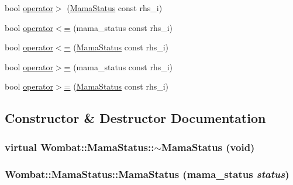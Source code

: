 \begin{DoxyCompactItemize}
bool \hyperlink{classWombat_1_1MamaStatus_a6e7e43173070445fd00008e30ebe528c}{operator$>$} (\hyperlink{classWombat_1_1MamaStatus}{MamaStatus} const rhs\_\-i)
\item 
bool \hyperlink{classWombat_1_1MamaStatus_a63e384ea83f45eabd80fee0d23bd9d45}{operator$<$=} (mama\_\-status const rhs\_\-i)
\item 
bool \hyperlink{classWombat_1_1MamaStatus_ab4c58d61bee325a9f373ab2a4020cd33}{operator$<$=} (\hyperlink{classWombat_1_1MamaStatus}{MamaStatus} const rhs\_\-i)
\item 
bool \hyperlink{classWombat_1_1MamaStatus_aad404529e433f463c7675185c4929aea}{operator$>$=} (mama\_\-status const rhs\_\-i)
\item 
bool \hyperlink{classWombat_1_1MamaStatus_a46a8e3636b33569d27d8d3c19060c8e3}{operator$>$=} (\hyperlink{classWombat_1_1MamaStatus}{MamaStatus} const rhs\_\-i)
\end{DoxyCompactItemize}


\subsection{Constructor \& Destructor Documentation}
\hypertarget{classWombat_1_1MamaStatus_a3c2d6f2875eb0d493e574a0fefcc069f}{
\subsubsection[{$\sim$MamaStatus}]{\setlength{\rightskip}{0pt plus 5cm}virtual Wombat::MamaStatus::$\sim$MamaStatus (void)}}
\label{classWombat_1_1MamaStatus_a3c2d6f2875eb0d493e574a0fefcc069f}
\hypertarget{classWombat_1_1MamaStatus_a216ce6c4ace254d2c8f47332369e27b6}{
\subsubsection[{MamaStatus}]{\setlength{\rightskip}{0pt plus 5cm}Wombat::MamaStatus::MamaStatus (mama\_\-status {\em status})}}
\label{classWombat_1_1MamaStatus_a216ce6c4ace254d2c8f47332369e27b6}


